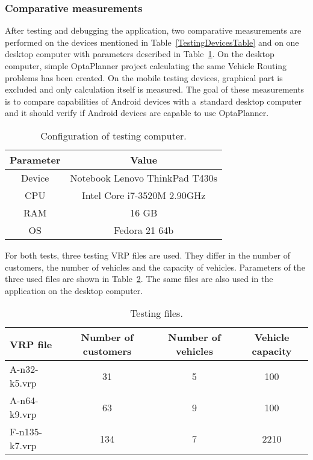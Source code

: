 \subsubsection{Comparative measurements}
After testing and debugging the application, two comparative measurements are performed on the devices mentioned in
Table~\ref{TestingDevicesTable} and on one desktop computer with parameters described in
Table~\ref{TestingComputerTable}. On the desktop computer, simple OptaPlanner project calculating the same Vehicle
Routing problems has been created. On the mobile testing devices, graphical part is excluded and only calculation itself
is measured. The goal of these measurements is to compare capabilities of Android devices with a~standard desktop
computer and it should verify if Android devices are capable to use OptaPlanner.
\\
\begin{table}[h!]
    \begin{tabular}{|c|c|}
        \hline
        \textbf{Parameter} &
        \textbf{Value} \\ \hline \hline
        Device    & Notebook Lenovo ThinkPad T430s \\ \hline
        CPU       & Intel Core i7-3520M 2.90GHz    \\ \hline
        RAM       & 16 GB                          \\ \hline
        OS        & Fedora 21 64b                  \\ \hline
    \end{tabular}
    \centering
    \caption{Configuration of testing computer.}
    \label{TestingComputerTable}
\end{table}

For both tests, three testing VRP files are used. They differ in the number of customers, the number of vehicles and
the capacity of vehicles. Parameters of the three used files are shown in Table~\ref{TestingFilesTable}. The same files
are also used in the application on the desktop computer.
\\
\begin{table}[h!]
    \begin{tabular}{|l|c|c|c|}
        \hline
        \textbf{VRP file} &
        \textbf{Number of customers} &
        \textbf{Number of vehicles} &
        \textbf{Vehicle capacity} \\ \hline \hline
        A-n32-k5.vrp   & 31   & 5 & 100  \\ \hline
        A-n64-k9.vrp   & 63   & 9 & 100  \\ \hline
        F-n135-k7.vrp  & 134  & 7 & 2210 \\ \hline
    \end{tabular}
    \centering
    \caption{Testing files.}
    \label{TestingFilesTable}
\end{table}


